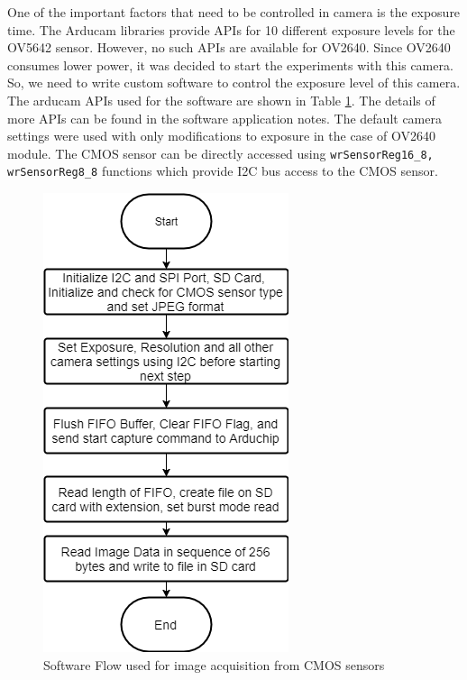 One of the important factors that need to be controlled in camera is the exposure time. The Arducam libraries provide APIs for 10 different exposure levels for the OV5642 sensor. However, no such APIs are available for OV2640. Since OV2640 consumes lower power, it was decided to start the experiments with this camera. So, we need to write custom software to control the exposure level of this camera. The arducam APIs used for the software are shown in Table \ref{fig:arducam_software}. The details of more APIs can be found in the software application notes\cite{ArducamSoftwareApp}. The default camera settings were used with only modifications to exposure in the case of OV2640 module. The CMOS sensor can be directly accessed using \texttt{wrSensorReg16\_8, wrSensorReg8\_8} functions which provide I2C bus access to the CMOS sensor.
\begin{figure}[!htbp]
\centering
\includegraphics[scale  = 0.5]{pics/SoftwareFlowOV2640}
\caption{Software Flow used for image acquisition from CMOS sensors}
\label{fig:arducam_software}
\end{figure}


